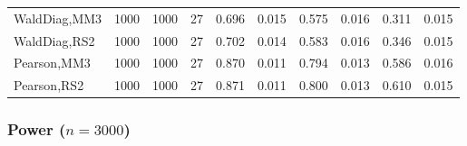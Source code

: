 \documentclass[
]{article}
\begin{document}
\begin{table}[H]
{\begin{tabular}[t]{lrrrrrrlrr}
\hspace{1em}WaldDiag,MM3 & 1000 & 1000 & 27 & 0.696 & 0.015 & 0.575 & 0.016 & 0.311 & 0.015\\
\hspace{1em}WaldDiag,RS2 & 1000 & 1000 & 27 & 0.702 & 0.014 & 0.583 & 0.016 & 0.346 & 0.015\\
\hspace{1em}Pearson,MM3 & 1000 & 1000 & 27 & 0.870 & 0.011 & 0.794 & 0.013 & 0.586 & 0.016\\
\hspace{1em}Pearson,RS2 & 1000 & 1000 & 27 & 0.871 & 0.011 & 0.800 & 0.013 & 0.610 & 0.015\\
\bottomrule
\end{tabular}}
\endgroup{}
\end{table}

\hypertarget{power-n3000-2}{%
\subsubsection{\texorpdfstring{Power
(\(n=3000\))}{Power (n=3000)}}\label{power-n3000-2}}
\end{document}
